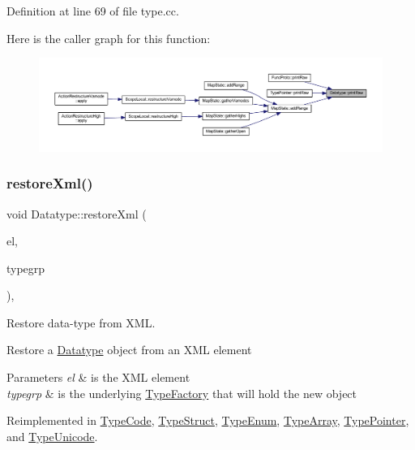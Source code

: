 Definition at line 69 of file type.\+cc.

Here is the caller graph for this function\+:
\nopagebreak
\begin{figure}[H]
\begin{center}
\leavevmode
\includegraphics[width=350pt]{class_datatype_a034a9b665df1a06f17fd3dfe61e7bf41_icgraph}
\end{center}
\end{figure}
\mbox{\label{class_datatype_aed882ae693a31a64d56fffb9abdaa575}} 
\subsubsection{\texorpdfstring{restoreXml()}{restoreXml()}}
{\footnotesize\ttfamily void Datatype\+::restore\+Xml (\begin{DoxyParamCaption}\item[{const \mbox{\hyperlink{class_element}{Element}} $\ast$}]{el,  }\item[{\mbox{\hyperlink{class_type_factory}{Type\+Factory}} \&}]{typegrp }\end{DoxyParamCaption})\hspace{0.3cm}{\ttfamily [protected]}, {\ttfamily [virtual]}}



Restore data-\/type from X\+ML. 

Restore a \mbox{\hyperlink{class_datatype}{Datatype}} object from an X\+ML element 
\begin{DoxyParams}{Parameters}
{\em el} & is the X\+ML element \\
\hline
{\em typegrp} & is the underlying \mbox{\hyperlink{class_type_factory}{Type\+Factory}} that will hold the new object \\
\hline
\end{DoxyParams}


Reimplemented in \mbox{\hyperlink{class_type_code_a8b721a26b30c296fe2510738601e3333}{Type\+Code}}, \mbox{\hyperlink{class_type_struct_af2b09832da8420f6da67382a4e2d9f0e}{Type\+Struct}}, \mbox{\hyperlink{class_type_enum_a1bd4dc88f4ea0b58b4b164b4b5f4f5e5}{Type\+Enum}}, \mbox{\hyperlink{class_type_array_a3f933b477f4089344f7a58ef67aa6ee1}{Type\+Array}}, \mbox{\hyperlink{class_type_pointer_a8f62fbff5e735eb8ad562878bc5efed7}{Type\+Pointer}}, and \mbox{\hyperlink{class_type_unicode_a3158417117649e59ffe402137c22bb67}{Type\+Unicode}}.



